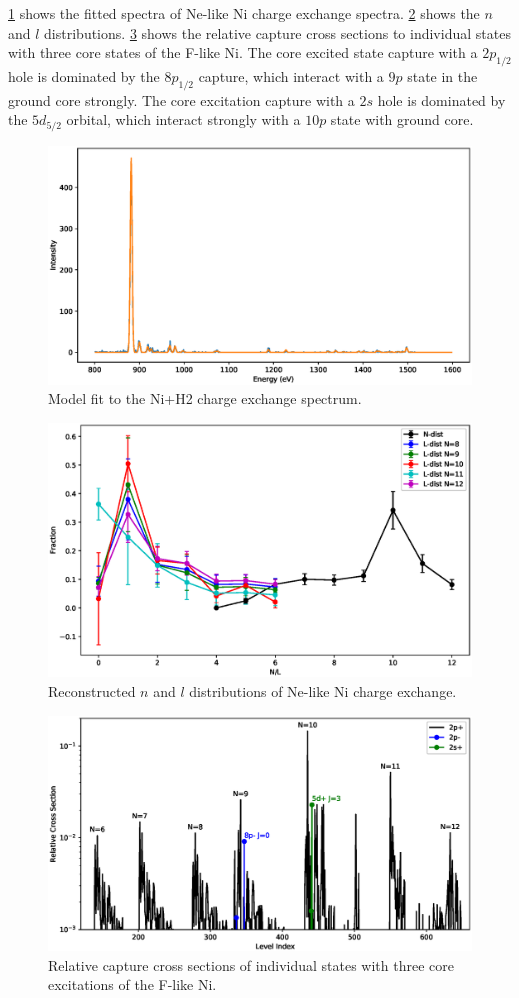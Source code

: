 \documentclass{aastex}
\begin{document}
\ref{fig:ni+h2.spec} shows the fitted spectra of Ne-like Ni charge exchange
spectra. \ref{fig:ni+h2.nldist} shows the $n$ and $l$
distributions. \ref{fig:ni+h2.icx} shows the relative capture cross sections
to individual states with three core states of the F-like Ni. The core excited
state capture with a $2p_{1/2}$ hole is dominated by the $8p_{1/2}$ capture,
which interact with a $9p$ state in the ground core strongly. The core
excitation capture with a $2s$ hole is dominated by the $5d_{5/2}$ orbital,
which interact strongly with a $10p$ state with ground core.
\begin{figure}
  \includegraphics[width=5in]{spec_ni_h2.eps}
  \caption{\label{fig:ni+h2.spec}Model fit to the Ni+H2 charge exchange
    spectrum.}
\end{figure}
\begin{figure}
  \includegraphics[width=5in]{nk_ni_h2.eps}
  \caption{\label{fig:ni+h2.nldist}Reconstructed $n$ and $l$ distributions of
    Ne-like Ni charge exchange.}
\end{figure}

\begin{figure}
  \includegraphics[width=5in]{icx_ni_h2.eps}
  \caption{\label{fig:ni+h2.icx}Relative capture cross sections of individual
    states with three core excitations of the F-like Ni.}
\end{figure}
\end{document}
